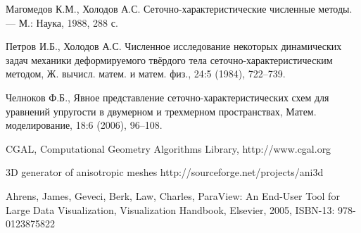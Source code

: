 \documentclass[a4paper]{article}
\numberwithin{equation}{section}
\begin{document}
\begin{thebibliography}{99}

 Магомедов К.М., Холодов А.С. 
Сеточно-характеристические численные методы. — М.: Наука, 1988, 288 с.

 Петров И.Б., Холодов А.С. 
Численное исследование некоторых динамических задач механики деформируемого 
твёрдого тела сеточно-характеристическим методом, 
Ж. вычисл. матем. и матем. физ., 24:5 (1984), 722–739.

 Челноков Ф.Б., Явное представление 
сеточно-характеристических схем для уравнений упругости в двумерном и
 трехмерном пространствах, Матем. моделирование, 18:6 (2006), 96–108.

 CGAL, Computational Geometry Algorithms Library, http://www.cgal.org

 3D generator of anisotropic meshes http://sourceforge.net/projects/ani3d

 Ahrens, James, Geveci, Berk, Law, Charles, 
ParaView: An End-User Tool for Large Data Visualization, Visualization Handbook, Elsevier, 2005, ISBN-13: 978-0123875822

\end{thebibliography}
\end{document}
